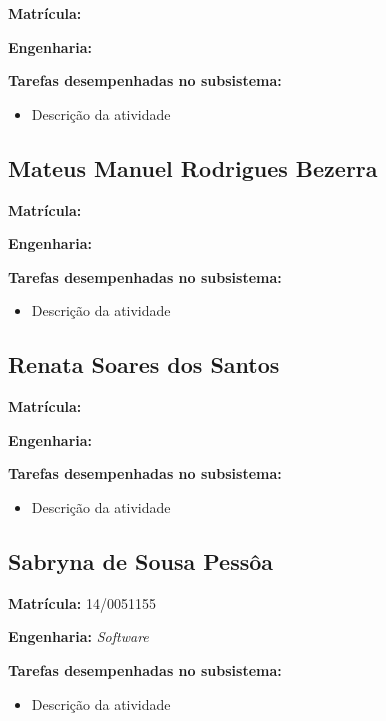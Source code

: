 \textbf{Matrícula:}

\textbf{Engenharia:}

\textbf{Tarefas desempenhadas no subsistema:}

\begin{itemize}
\item Descrição da atividade
\end{itemize}


\subsection{Mateus Manuel Rodrigues Bezerra}

\textbf{Matrícula:}

\textbf{Engenharia:}

\textbf{Tarefas desempenhadas no subsistema:}

\begin{itemize}
\item Descrição da atividade
\end{itemize}


\subsection{Renata Soares dos Santos}

\textbf{Matrícula:}

\textbf{Engenharia:}

\textbf{Tarefas desempenhadas no subsistema:}

\begin{itemize}
\item Descrição da atividade
\end{itemize}


\subsection{Sabryna de Sousa Pessôa}

\textbf{Matrícula:} 14/0051155

\textbf{Engenharia:} \textit{Software}

\textbf{Tarefas desempenhadas no subsistema:}

\begin{itemize}
\item Descrição da atividade
\end{itemize}

